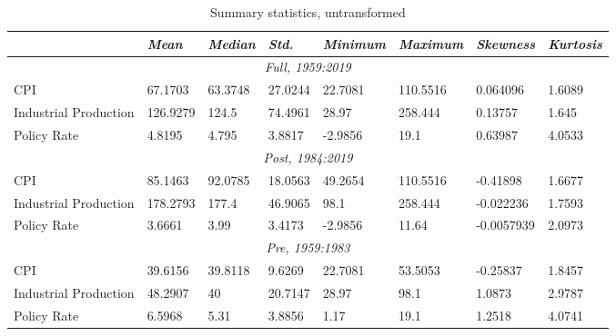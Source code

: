 \begin{table}[!htpb]
    \caption{Summary statistics, untransformed}
    \centering
    \begin{threeparttable}
    \begin{adjustbox}{max width=\textwidth}
        \begin{tabular}{llllllll}
            \toprule 
            & \textit{Mean} & \textit{Median} & \textit{Std.} & \textit{Minimum} & \textit{Maximum} & \textit{Skewness} & \textit{Kurtosis} \\ 
            \midrule
        \multicolumn{8}{c}{\textit{Full, 1959:2019}} \\ 
        \midrule
            CPI & 67.1703 & 63.3748 & 27.0244 & 22.7081 & 110.5516 & 0.064096 & 1.6089 \\ 
            Industrial Production & 126.9279 & 124.5 & 74.4961 & 28.97 & 258.444 & 0.13757 & 1.645 \\ 
            Policy Rate & 4.8195 & 4.795 & 3.8817 & -2.9856 & 19.1 & 0.63987 & 4.0533 \\ 
        \midrule
        \multicolumn{8}{c}{\textit{Post, 1984:2019}} \\ 
        \midrule
            CPI & 85.1463 & 92.0785 & 18.0563 & 49.2654 & 110.5516 & -0.41898 & 1.6677 \\ 
            Industrial Production & 178.2793 & 177.4 & 46.9065 & 98.1 & 258.444 & -0.022236 & 1.7593 \\ 
            Policy Rate & 3.6661 & 3.99 & 3.4173 & -2.9856 & 11.64 & -0.0057939 & 2.0973 \\ 
        \midrule
        \multicolumn{8}{c}{\textit{Pre, 1959:1983}} \\ 
        \midrule
            CPI & 39.6156 & 39.8118 & 9.6269 & 22.7081 & 53.5053 & -0.25837 & 1.8457 \\ 
            Industrial Production & 48.2907 & 40 & 20.7147 & 28.97 & 98.1 & 1.0873 & 2.9787 \\ 
            Policy Rate & 6.5968 & 5.31 & 3.8856 & 1.17 & 19.1 & 1.2518 & 4.0741 \\ 
        \bottomrule 
    \end{tabular}
    \end{adjustbox}
    \label{tab:FullSample}
\end{threeparttable}
\end{table}